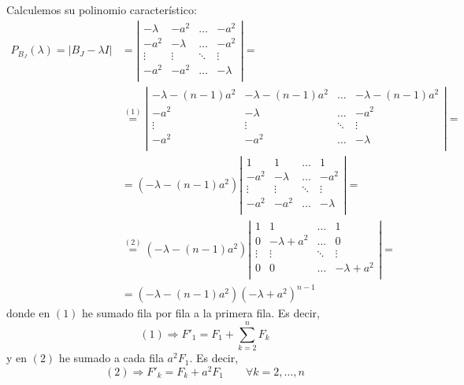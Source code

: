 \documentclass[12pt]{article}
\begin{document}
\begin{ejercicio} 
\begin{enumerate}
        Calculemos su polinomio característico:
        \begin{equation*}\begin{split}
            P_{B_J}(\lambda)=|B_J-\lambda I|&=
            \left| \begin{array}{cccc}
                -\lambda & -a^2 & \dots & -a^2 \\
                -a^2 & -\lambda & \dots & -a^2 \\
                \vdots & \vdots & \ddots & \vdots \\
                -a^2 & -a^2 & \dots & -\lambda\\
            \end{array}\right|
            =\\ & \stackrel{(1)}{=}
            \left| \begin{array}{cccc}
                -\lambda-(n-1)a^2 & -\lambda-(n-1)a^2 & \dots & -\lambda-(n-1)a^2 \\
                -a^2 & -\lambda & \dots & -a^2 \\
                \vdots & \vdots & \ddots & \vdots \\
                -a^2 & -a^2 & \dots & -\lambda\\
            \end{array}\right|
            =\\ &=(-\lambda-(n-1)a^2)
            \left| \begin{array}{cccc}
                1 & 1 & \dots & 1 \\
                -a^2 & -\lambda & \dots & -a^2 \\
                \vdots & \vdots & \ddots & \vdots \\
                -a^2 & -a^2 & \dots & -\lambda\\
            \end{array}\right|
            = \\ &\stackrel{(2)}{=}
            (-\lambda-(n-1)a^2)
            \left| \begin{array}{cccc}
                1 & 1 & \dots & 1 \\
                0 & -\lambda+a^2 & \dots & 0 \\
                \vdots & \vdots & \ddots & \vdots \\
                0 &0  & \dots & -\lambda+a^2\\
            \end{array}\right|
            = \\ &= (-\lambda-(n-1)a^2)(-\lambda+a^2)^{n-1}
        \end{split}\end{equation*}
        donde en $(1)$ he sumado fila por fila a la primera fila. Es decir,
        $$(1)\Longrightarrow F'_1 = F_1 + \sum_{k=2}^nF_k$$
        y en $(2)$ he sumado a cada fila $a^2F_1$. Es decir,
        $$(2)\Longrightarrow F'_k = F_k + a^2F_1 \qquad \forall k=2,\dots,n$$


\end{enumerate}
\end{ejercicio}
\end{document}
